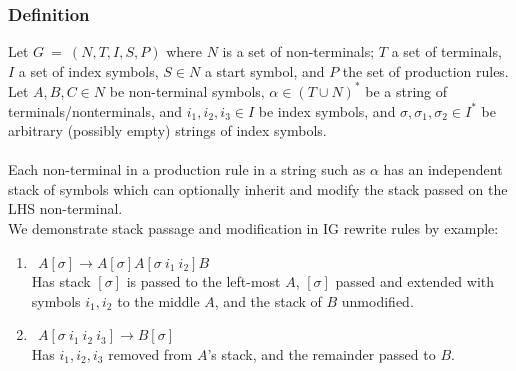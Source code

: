 \documentclass[11pt]{article}
\begin{document}
\subsubsection {Definition}
Let $G \ = \ (N, T, I, S, P)$ where $N$ is a set of non-terminals; $T$ a set of terminals, $I$ a set of index symbols,
$S \in N$ a start symbol, and $P$ the set of production rules.
Let $A, B, C \in N$ be non-terminal symbols, $\alpha \in (T \cup N)^*$ be a string of terminals/nonterminals, 
and $i_1, i_2, i_3 \in I$ be index symbols, and $\sigma, \sigma_1, \sigma_2 \in I^*$ be arbitrary (possibly empty) strings of index symbols. \\ \\
Each non-terminal in a production rule in a string such as $\alpha$ has an independent stack of symbols which can optionally inherit and modify the stack passed on the LHS non-terminal.\\
We demonstrate stack passage and modification in IG rewrite rules by example:
\begin{enumerate}
\item $\ \ A[\sigma] \rightarrow A[\sigma]A[\sigma \ i_1 \ i_2]B$ \\ Has stack $[\sigma]$ is passed to the left-most $A$, $[\sigma]$ passed and extended with symbols $i_1, i_2$ to the middle $A$, and the stack of $B$ unmodified.
\item $\ \ A[\sigma \ i_1 \ i_2 \ i_3] \rightarrow B[\sigma]$ \\ Has $i_1, i_2, i_3$ removed from $A$'s stack, and the remainder passed to $B$.
\end{enumerate}
\end{document}
